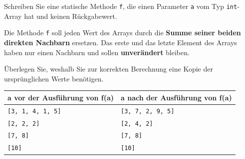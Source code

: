 \documentclass[
	fontsize=12pt,
	paper=a4,
	numbers=noenddot,
	parskip=half,
	openany
]{scrbook}
\begin{document}
Schreiben Sie eine statische Methode \texttt{f}, die einen Parameter \texttt{a} vom Typ \texttt{int}-Array hat und keinen Rückgabewert.

Die Methode \texttt{f} soll jeden Wert des Arrays durch die \textbf{Summe seiner beiden direkten Nachbarn} ersetzen. Das erste und das letzte Element des Arrays haben nur einen Nachbarn und sollen \textbf{unverändert} bleiben.

\begin{hinweis}[Hinweis]
	Überlegen Sie, weshalb Sie zur korrekten Berechnung eine Kopie der ursprünglichen Werte benötigen.
\end{hinweis}

\begin{center}
\begin{tabular}{l l}
	\toprule
	\textbf{a vor der Ausführung von f(a)} & \textbf{a nach der Ausführung von f(a)} \\
	\midrule
	\texttt{[3, 1, 4, 1, 5]} & \texttt{[3, 7, 2, 9, 5]} \\
	\texttt{[2, 2, 2]}       & \texttt{[2, 4, 2]} \\
	\texttt{[7, 8]}          & \texttt{[7, 8]} \\
	\texttt{[10]}            & \texttt{[10]} \\
	\bottomrule
\end{tabular}
\end{center}
\end{document}
